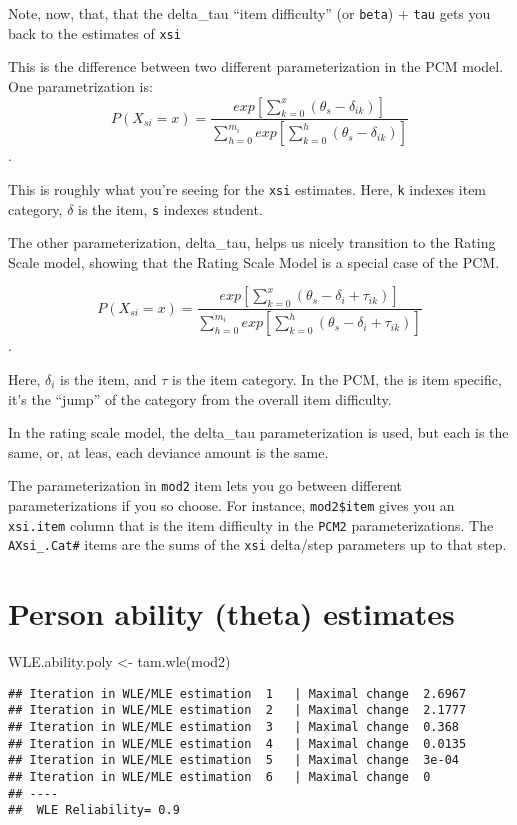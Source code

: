 \documentclass[
]{book}
\newenvironment{Shaded}{\begin{snugshade}}{\end{snugshade}}
\newcommand{\FunctionTok}[1]{\textcolor[rgb]{0.00,0.00,0.00}{#1}}
\newcommand{\NormalTok}[1]{#1}
\newcommand{\OtherTok}[1]{\textcolor[rgb]{0.56,0.35,0.01}{#1}}
\begin{document}
Note, now, that, that the delta\_tau ``item difficulty'' (or \texttt{beta}) + \texttt{tau} gets you back to the estimates of \texttt{xsi}

This is the difference between two different parameterization in the PCM model. One parametrization is:
\[P(X_{si} = x) = \frac{exp[\sum_{k=0}^x(\theta_s-\delta_{ik})]}{\sum_{h=0}^{m_i}exp[\sum_{k=0}^h(\theta_s-\delta_{ik})]}\].

This is roughly what you're seeing for the \texttt{xsi} estimates. Here, \texttt{k} indexes item category, \(\delta\) is the item, \texttt{s} indexes student.

The other parameterization, delta\_tau, helps us nicely transition to the Rating Scale model, showing that the Rating Scale Model is a special case of the PCM.

\[P(X_{si} = x) = \frac{exp[\sum_{k=0}^x(\theta_s-\delta_{i}+\tau_{ik})]}{\sum_{h=0}^{m_i}exp[\sum_{k=0}^h(\theta_s-\delta_{i} + \tau_{ik})]}\].

Here, \(\delta_i\) is the item, and \(\tau\) is the item category. In the PCM, the \tau is item specific, it's the ``jump'' of the category from the overall item difficulty.

In the rating scale model, the delta\_tau parameterization is used, but each \tau is the same, or, at leas, each deviance amount is the same.

The parameterization in \texttt{mod2} item lets you go between different parameterizations if you so choose. For instance, \texttt{mod2\$item} gives you an \texttt{xsi.item} column that is the item difficulty in the \texttt{PCM2} parameterizations. The \texttt{AXsi\_.Cat\#} items are the sums of the \texttt{xsi} delta/step parameters up to that step.

\hypertarget{person-ability-theta-estimates}{%
\section{Person ability (theta) estimates}\label{person-ability-theta-estimates}}

\begin{Shaded}
\begin{Highlighting}[]
\NormalTok{WLE.ability.poly }\OtherTok{\textless{}{-}} \FunctionTok{tam.wle}\NormalTok{(mod2)}
\end{Highlighting}
\end{Shaded}

\begin{verbatim}
## Iteration in WLE/MLE estimation  1   | Maximal change  2.6967 
## Iteration in WLE/MLE estimation  2   | Maximal change  2.1777 
## Iteration in WLE/MLE estimation  3   | Maximal change  0.368 
## Iteration in WLE/MLE estimation  4   | Maximal change  0.0135 
## Iteration in WLE/MLE estimation  5   | Maximal change  3e-04 
## Iteration in WLE/MLE estimation  6   | Maximal change  0 
## ----
##  WLE Reliability= 0.9
\end{verbatim}
\end{document}

